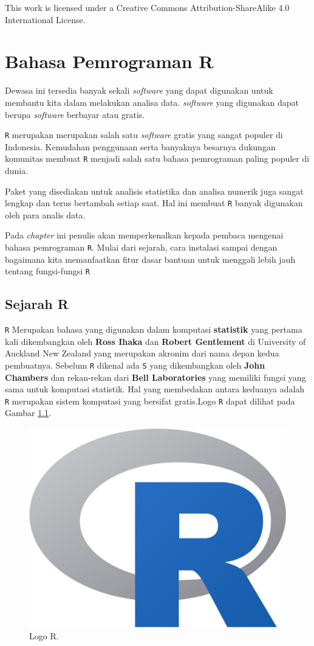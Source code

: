 \documentclass[]{book}
\theoremstyle{definition}
\theoremstyle{definition}
\theoremstyle{definition}
\theoremstyle{remark}
\begin{document}
This
work is licensed under a
Creative
Commons Attribution-ShareAlike 4.0 International License.

\hypertarget{intro}{%
\chapter{Bahasa Pemrograman R}\label{intro}}

Dewasa ini tersedia banyak sekali \emph{software} yang dapat digunakan untuk membantu kita dalam melakukan analisa data. \emph{software} yang digunakan dapat berupa \emph{software} berbayar atau gratis.

\texttt{R} merupakan merupakan salah satu \emph{software} gratis yang sangat populer di Indonesia. Kemudahan penggunaan serta banyaknya besarnya dukungan komunitas membuat \texttt{R} menjadi salah satu bahasa pemrograman paling populer di dunia.

Paket yang disediakan untuk analisis statistika dan analisa numerik juga sangat lengkap dan terus bertambah setiap saat. Hal ini membuat \texttt{R} banyak digunakan oleh para analis data.

Pada \emph{chapter} ini penulis akan memperkenalkan kepada pembaca mengenai bahasa pemrograman \texttt{R}. Mulai dari sejarah, cara instalasi sampai dengan bagaimana kita memanfaatkan fitur dasar bantuan untuk menggali lebih jauh tentang fungsi-fungsi \texttt{R}

\hypertarget{sejarahR}{%
\section{Sejarah R}\label{sejarahR}}

\texttt{R} Merupakan bahasa yang digunakan dalam komputasi \textbf{statistik} yang pertama kali dikembangkan oleh \textbf{Ross Ihaka} dan \textbf{Robert Gentlement} di University of Auckland New Zealand yang merupakan akronim dari nama depan kedua pembuatnya. Sebelum \texttt{R} dikenal ada \texttt{S} yang dikembangkan oleh \textbf{John Chambers} dan rekan-rekan dari \textbf{Bell Laboratories} yang memiliki fungsi yang sama untuk komputasi statistik. Hal yang membedakan antara keduanya adalah \texttt{R} merupakan sistem komputasi yang bersifat gratis.Logo \texttt{R} dapat dilihat pada Gambar \ref{fig:Logo}.

\begin{figure}

{\centering \includegraphics[width=0.4\linewidth]{./images/r-icon} 

}

\caption{Logo R.}\label{fig:Logo}
\end{figure}
\end{document}
